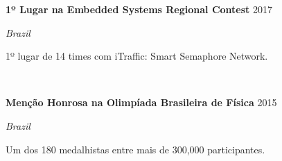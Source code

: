 \documentclass[letterpaper,10pt]{article}
\newcommand{\entry}[4]{

\begin{minipage}[t]{.15\textwidth}
\end{minipage}
\hfill\vline\hfill 
\begin{minipage}[t]{0.95\textwidth}
#2 \hfill \textsc{#1}

\textit{#3}

\footnotesize{#4}
\end{minipage}\\\vspace{.25cm}}
\begin{document}
\entry{2017}{\textbf{1º Lugar na Embedded Systems Regional Contest}}{Brazil}{
	1º lugar de 14 times com iTraffic: Smart Semaphore Network.
}

\entry{2015}{\textbf{Menção Honrosa na Olimpíada Brasileira de Física}}{Brazil}{
	Um dos 180 medalhistas entre mais de 300,000 participantes.
}
\vspace*{-.25cm}
\end{document}
